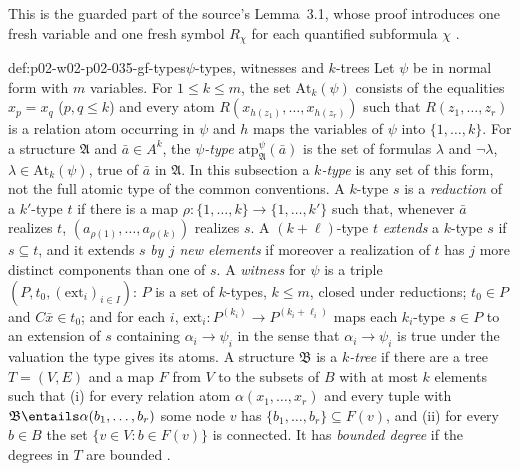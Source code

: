 This is the guarded part of the source's Lemma~3.1, whose proof introduces
one fresh variable and one fresh symbol \(R_\chi\) for each quantified
subformula \(\chi\) \cite[lem.~3.1]{Gradel1999}.

\begin{hbdefinition}{def:p02-w02-p02-035-gf-types}{\(\psi\)-types, witnesses and \(k\)-trees}
Let \(\psi\) be in normal form with \(m\) variables.  For \(1\leq k\leq m\),
the set \(\mathrm{At}_k(\psi)\) consists of the equalities \(x_p=x_q\)
(\(p,q\leq k\)) and every atom \(R(x_{h(z_1)},\ldots,x_{h(z_r)})\) such that
\(R(z_1,\ldots,z_r)\) is a relation atom occurring in \(\psi\) and \(h\) maps
the variables of \(\psi\) into \(\{1,\ldots,k\}\).  For a structure
\(\mathfrak A\) and \(\bar a\in A^k\), the \emph{\(\psi\)-type}
\(\mathrm{atp}^{\psi}_{\mathfrak A}(\bar a)\) is the set of formulas
\(\lambda\) and \(\neg\lambda\), \(\lambda\in\mathrm{At}_k(\psi)\), true of
\(\bar a\) in \(\mathfrak A\).  In this subsection a \emph{\(k\)-type} is any
set of this form, not the full atomic type of the common conventions.
A \(k\)-type \(s\) is a \emph{reduction} of a \(k'\)-type \(t\) if there is a
map \(\rho:\{1,\ldots,k\}\to\{1,\ldots,k'\}\) such that, whenever \(\bar a\)
realizes \(t\), \((a_{\rho(1)},\ldots,a_{\rho(k)})\) realizes \(s\).  A
\((k+\ell)\)-type \(t\) \emph{extends} a \(k\)-type \(s\) if \(s\subseteq t\),
and it extends \(s\) \emph{by \(j\) new elements} if moreover a realization of
\(t\) has \(j\) more distinct components than one of \(s\).  A \emph{witness}
for \(\psi\) is a triple \((P,t_0,(\mathrm{ext}_i)_{i\in I})\): \(P\) is a set of
\(k\)-types, \(k\leq m\), closed under reductions; \(t_0\in P\) and
\(C\bar x\in t_0\); and for each \(i\),
\(\mathrm{ext}_i:P^{(k_i)}\to P^{(k_i+\ell_i)}\) maps each \(k_i\)-type \(s\in P\)
to an extension of \(s\) containing \(\alpha_i\to\psi_i\) in the sense that
\(\alpha_i\to\psi_i\) is true under the valuation the type gives its atoms.
A structure \(\mathfrak B\) is a \emph{\(k\)-tree} if there are a tree
\(T=(V,E)\) and a map \(F\) from \(V\) to the subsets of \(B\) with at most
\(k\) elements such that (i) for every relation atom \(\alpha(x_1,\ldots,x_r)\)
and every tuple with \(\mathfrak B\entails\alpha(b_1,\ldots,b_r)\) some node
\(v\) has \(\{b_1,\ldots,b_r\}\subseteq F(v)\), and (ii) for every \(b\in B\)
the set \(\{v\in V:b\in F(v)\}\) is connected.  It has \emph{bounded degree}
if the degrees in \(T\) are bounded
\cite[defs.~3.2, 3.3 and 3.5]{Gradel1999}.
\end{hbdefinition}

